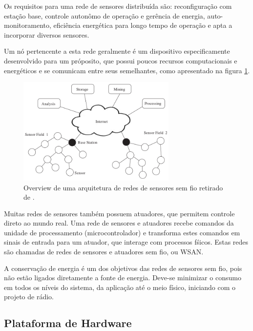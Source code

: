Os requisitos para uma rede de sensores distribu\'ida s\~ao: reconfigura\c{c}\~ao com esta\c{c}\~ao base, controle auton\^omo de opera\c{c}\~ao e ger\^encia de energia, auto-monitoramento, efici\^encia energ\'etica para longo tempo de opera\c{c}\~ao e apta a incorporar diversos sensores.\cite{542724}

Um n\'o pertencente a esta rede geralmente \'e um dispositivo especificamente desenvolvido para um pr\'oposito, que possui poucos recursos computacionais e energ\'eticos e se comunicam entre seus semelhantes, como apresentado na figura \ref{wsnOverview}.

\begin{figure}[h]
   \label{wsnOverview}
   \centering
   \includegraphics[width=0.7\textwidth]{figuras/wsn.png}
   \caption{Overview de uma arquitetura de redes de sensores sem fio retirado de \cite{dargie2010fundamentals}.}
\end{figure}

Muitas redes de sensores tamb\'em possuem atuadores, que permitem controle direto ao mundo real. Uma rede de sensores e atuadores recebe comandos da unidade de processamento (microcontrolador) e transforma estes comandos em sinais de entrada para um atuador, que interage com processos f\'sicos. Estas redes s\~ao chamadas de redes de sensores e atuadores sem fio, ou WSAN.

A conserva\c{c}\~ao de energia \'e um dos objetivos das redes de sensores sem fio, pois n\~ao est\~ao ligados diretamente a fonte de energia. Deve-se minimizar o consumo em todos os n\'iveis do sistema, da aplica\c{c}\~ao at\'e o meio f\'isico, iniciando com o projeto de r\'adio. \cite{WsnSurvey2008} 

\subsection{Plataforma de Hardware}

